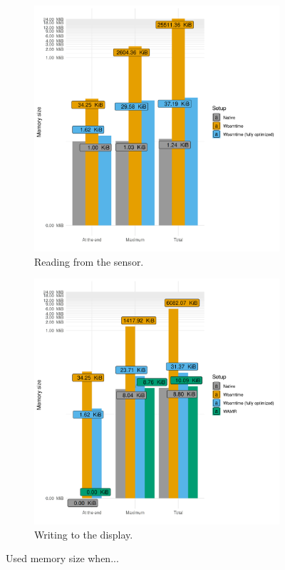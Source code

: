 \begin{figure}[h]
\centering
\begin{subfigure}{.5\textwidth}
  \includegraphics[width=\linewidth]{figures/sensor_memory}
  \caption{Reading from the sensor.}
\end{subfigure}%
\begin{subfigure}{.5\textwidth}
  \includegraphics[width=\linewidth]{figures/display_memory}
  \caption{Writing to the display.}
\end{subfigure}%
\caption{Used memory size when...}
  \label{fig:mem}
\end{figure}

